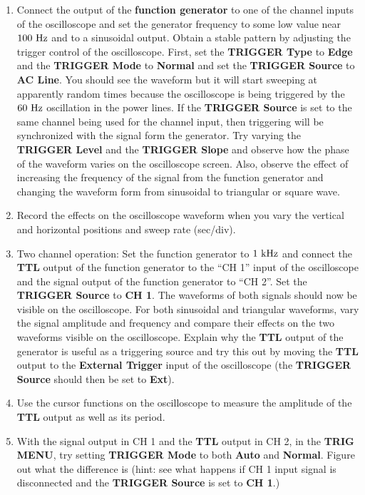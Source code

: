 \documentclass[12pt,oneside,openany,letterpaper]{article}
\begin{document}
\begin{enumerate}[label=\alph*)]
\item Connect the output of the {\bf function generator} to one of the channel inputs of the oscilloscope and set the generator frequency to some low value near $100\rm\ Hz$ and to a sinusoidal output. Obtain a stable pattern by adjusting the trigger control of the oscilloscope. First, set the {\bf TRIGGER Type} to {\bf Edge} and the {\bf TRIGGER Mode} to {\bf Normal} and set the {\bf TRIGGER Source} to {\bf AC Line}. You should see the waveform but it will start sweeping at apparently random times because the oscilloscope is being triggered by the $60\rm\ Hz$ oscillation in the power lines. If the {\bf TRIGGER Source} is set to the same channel being used for the channel input, then triggering will be synchronized with the signal form the generator. Try varying the {\bf TRIGGER Level} and the {\bf TRIGGER Slope} and observe how the phase of the waveform varies on the oscilloscope screen. Also, observe the effect of increasing the frequency of the signal from the function generator and changing the waveform form from sinusoidal to triangular or square wave.
\item Record the effects on the oscilloscope waveform when you vary the vertical and horizontal positions and sweep rate (sec/div).
\item Two channel operation: Set the function generator to $1\rm\ kHz$ and connect the {\bf TTL} output of the function generator to the ``CH 1'' input of the oscilloscope and the signal output of the function generator to ``CH 2''. Set the {\bf TRIGGER Source} to {\bf CH 1}. The waveforms of both signals should now be visible on the oscilloscope. For both sinusoidal and triangular waveforms, vary the signal amplitude and frequency and compare their effects on the two waveforms visible on the oscilloscope. Explain why the {\bf TTL} output of the generator is useful as a triggering source and try this out by moving the {\bf TTL} output to the {\bf External Trigger} input of the oscilloscope (the {\bf TRIGGER Source} should then be set to {\bf Ext}).
\item Use the cursor functions on the oscilloscope to measure the amplitude of the {\bf TTL} output as well as its period.
\item With the signal output in CH 1 and the {\bf TTL} output in CH 2, in the {\bf TRIG MENU}, try setting {\bf TRIGGER Mode} to both {\bf Auto} and {\bf Normal}. Figure out what the difference is (hint: see what happens if CH 1 input signal is disconnected and the {\bf TRIGGER Source} is set to {\bf CH 1}.)
\end{enumerate}
\end{document}
